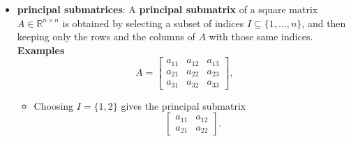 \documentclass{report}
\begin{document}
\begin{itemize}
        
        \item \textbf{principal submatrices}: 
            A \textbf{principal submatrix} of a square matrix 
            $A \in \mathbb{R}^{n \times n}$ is obtained by selecting a subset of indices 
            $I \subseteq \{1, \ldots, n\}$, and then keeping only the rows and the columns of $A$ with those same indices.
            \bigbreak \noindent 
            \textbf{Examples}
            \[
                A =
                \begin{bmatrix}
                    a_{11} & a_{12} & a_{13} \\
                    a_{21} & a_{22} & a_{23} \\
                    a_{31} & a_{32} & a_{33}
                \end{bmatrix},
            \]
            \begin{itemize}
                \item Choosing $I = \{1,2\}$ gives the principal submatrix
                    \[
                        \begin{bmatrix}
                            a_{11} & a_{12} \\
                            a_{21} & a_{22}
                        \end{bmatrix}.
                    \]


\end{itemize}
\end{itemize}
\end{document}
